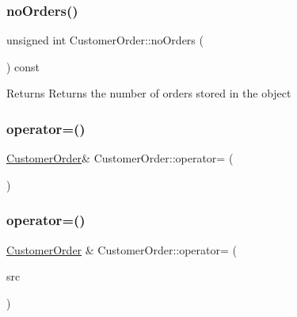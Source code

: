 \subsubsection{\texorpdfstring{no\+Orders()}{noOrders()}}
{\footnotesize\ttfamily unsigned int Customer\+Order\+::no\+Orders (\begin{DoxyParamCaption}{ }\end{DoxyParamCaption}) const}

\begin{DoxyReturn}{Returns}
Returns the number of orders stored in the object 
\end{DoxyReturn}
\mbox{\label{class_customer_order_ae43fcf650924cf82800c6dfe9a20afca}} 
\subsubsection{\texorpdfstring{operator=()}{operator=()}\hspace{0.1cm}{\footnotesize\ttfamily [1/2]}}
{\footnotesize\ttfamily \mbox{\hyperlink{class_customer_order}{Customer\+Order}}\& Customer\+Order\+::operator= (\begin{DoxyParamCaption}\item[{const \mbox{\hyperlink{class_customer_order}{Customer\+Order}} \&}]{ }\end{DoxyParamCaption})\hspace{0.3cm}{\ttfamily [delete]}}

\mbox{\label{class_customer_order_ae2af41f59a0b0856fae309779f915390}} 
\subsubsection{\texorpdfstring{operator=()}{operator=()}\hspace{0.1cm}{\footnotesize\ttfamily [2/2]}}
{\footnotesize\ttfamily \mbox{\hyperlink{class_customer_order}{Customer\+Order}} \& Customer\+Order\+::operator= (\begin{DoxyParamCaption}\item[{\mbox{\hyperlink{class_customer_order}{Customer\+Order}} \&\&}]{src }\end{DoxyParamCaption})}

